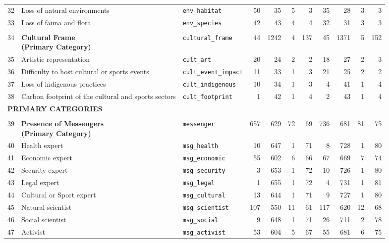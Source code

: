 \begin{longtable}{p{0.5cm}p{4.0cm}p{3.0cm}rrrrrrrr}
32 & Loss of natural environments & \texttt{env\_habitat} & 50 & 35 & 5 & 3 & 35 & 28 & 3 & 3 \\
33 & Loss of fauna and flora & \texttt{env\_species} & 42 & 43 & 4 & 4 & 32 & 31 & 3 & 3 \\
\midrule
\rowcolor{gray!8}
\multicolumn{11}{l}{\textit{Cultural Frame}} \\
\midrule
34 & \textbf{Cultural Frame\newline (Primary Category)} & \texttt{cultural\_frame} & 44 & 1242 & 4 & 137 & 45 & 1371 & 5 & 152 \\
\cmidrule(lr){1-11}
35 & Artistic representation & \texttt{cult\_art} & 20 & 24 & 2 & 2 & 18 & 27 & 2 & 3 \\
36 & Difficulty to host cultural or sports events & \texttt{cult\_event\_impact} & 11 & 33 & 1 & 3 & 21 & 25 & 2 & 2 \\
37 & Loss of indigenous practices & \texttt{cult\_indigenous} & 10 & 34 & 1 & 3 & 4 & 41 & 1 & 4 \\
38 & Carbon footprint of the cultural and sports sectors & \texttt{cult\_footprint} & 1 & 42 & 1 & 4 & 2 & 43 & 1 & 4 \\
\midrule
\multicolumn{11}{l}{\cellcolor{gray!10}\textbf{PRIMARY CATEGORIES}} \\
\midrule
\rowcolor{gray!8}
\multicolumn{11}{l}{\textit{Actors/Messengers}} \\
\midrule
39 & \textbf{Presence of Messengers\newline (Primary Category)} & \texttt{messenger} & 657 & 629 & 72 & 69 & 736 & 681 & 81 & 75 \\
\cmidrule(lr){1-11}
40 & Health expert & \texttt{msg\_health} & 10 & 647 & 1 & 71 & 8 & 728 & 1 & 80 \\
41 & Economic expert & \texttt{msg\_economic} & 55 & 602 & 6 & 66 & 67 & 669 & 7 & 74 \\
42 & Security expert & \texttt{msg\_security} & 3 & 653 & 1 & 72 & 10 & 726 & 1 & 80 \\
43 & Legal expert & \texttt{msg\_legal} & 1 & 655 & 1 & 72 & 4 & 731 & 1 & 81 \\
44 & Cultural or Sport expert & \texttt{msg\_cultural} & 13 & 644 & 1 & 71 & 9 & 727 & 1 & 80 \\
45 & Natural scientist & \texttt{msg\_scientist} & 107 & 550 & 11 & 61 & 117 & 620 & 12 & 68 \\
46 & Social scientist & \texttt{msg\_social} & 9 & 648 & 1 & 71 & 26 & 711 & 2 & 78 \\
47 & Activist & \texttt{msg\_activist} & 53 & 604 & 5 & 67 & 55 & 681 & 6 & 75 \\

\end{longtable}
